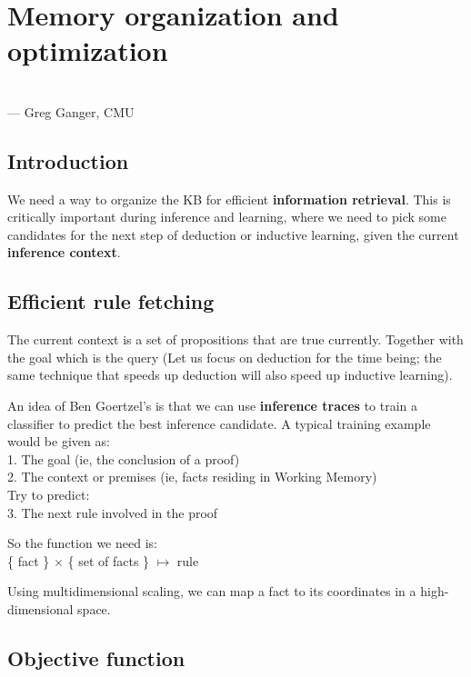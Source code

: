 \chapter{Memory organization and optimization}
\begin{flushright}
\\ --- Greg Ganger, CMU
\end{flushright}
\minitoc

\section{Introduction}
\label{sec:associative-memory}

We need a way to organize the KB for efficient \textbf{information retrieval}.  This is critically important during inference and learning, where we need to pick some candidates for the next step of deduction or inductive learning, given the current \textbf{inference context}.

\section{Efficient rule fetching}

The current context is a set of propositions that are true currently.  Together with the goal which is the query (Let us focus on deduction for the time being;  the same technique that speeds up deduction will also speed up inductive learning).

An idea of Ben Goertzel's is that we can use \textbf{inference traces} to train a classifier to predict the best inference candidate.  A typical training example would be given as:\\
1. The goal (ie, the conclusion of a proof)\\
2. The context or premises (ie, facts residing in Working Memory)\\
Try to predict:\\
3. The next rule involved in the proof

So the function we need is:\\
\tab \{ fact \} $\times$ \{ set of facts \} $\mapsto$ rule

Using multidimensional scaling, we can map a fact to its coordinates in a high-dimensional space.

\section{Objective function}

